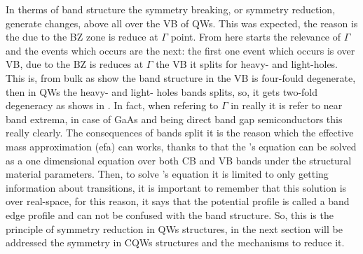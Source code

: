 In therms of band structure the symmetry breaking, or symmetry reduction, generate changes, above all over the VB of \gls{QW}s. This was expected, the reason is the due to the \gls{BZ} zone is reduce at $\Gamma$ point. From here starts the relevance of $\Gamma$ and the events which occurs are the next: the first one event which occurs is over VB, due to the \gls{BZ} is reduces at  $\Gamma$ the \gls{VB} it splits for heavy- and light-holes. This is, from bulk as show the band structure in  the \gls{VB} is four-fould degenerate, then in QWs the heavy- and light- holes bands splits, so,  it gets two-fold degeneracy as shows in . In fact, when refering to $\Gamma$ in really it is refer to near band extrema, in case of GaAs and \algaas  being direct band gap semiconductors this really clearly. The consequences of bands split it is the reason which the effective mass approximation (\gls{efa}) can works, thanks to that the \sch's equation can be solved as a one dimensional equation over both \gls{CB} and \gls{VB} bands  under the structural material parameters. 
Then, to solve \sch's equation it is limited to only getting information about transitions, it is important to remember that this solution is over real-space, for this reason, it says that the potential profile is called a band edge profile and can not be confused with the band structure. So, this is the principle of symmetry reduction in \gls{QW}s structures, in the next section will be addressed the symmetry in \gls{CQWs} structures and the mechanisms to reduce it. 


	


